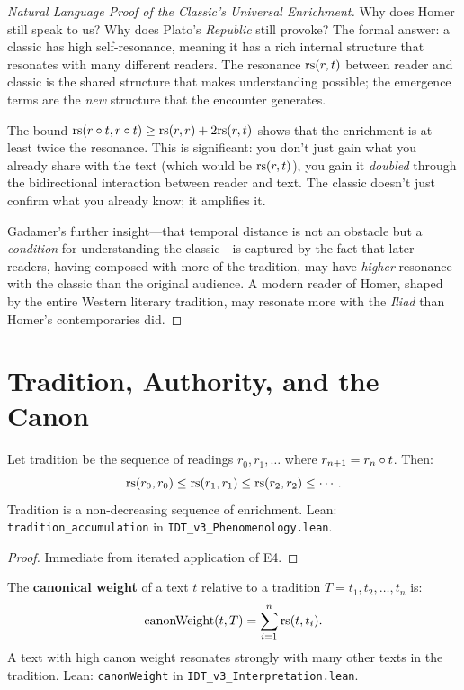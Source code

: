\begin{proof}[Natural Language Proof of the Classic's Universal Enrichment]
Why does Homer still speak to us?  Why does Plato's \textit{Republic} still
provoke?  The formal answer: a classic has high self-resonance, meaning it
has a rich internal structure that resonates with many different readers.
The resonance $\mathrm{rs}(r, t)$ between reader and classic is the shared structure
that makes understanding possible; the emergence terms are the \emph{new}
structure that the encounter generates.

The bound $\mathrm{rs}(r \circ t, r \circ t) \geq \mathrm{rs}(r, r) + 2\mathrm{rs}(r, t)$
shows that the enrichment is at least twice the resonance.  This is
significant: you don't just gain what you already share with the text
(which would be $\mathrm{rs}(r, t)$), you gain it \emph{doubled} through the
bidirectional interaction between reader and text.  The classic doesn't
just confirm what you already know; it amplifies it.

Gadamer's further insight---that temporal distance is not an obstacle but
a \emph{condition} for understanding the classic---is captured by the fact
that later readers, having composed with more of the tradition, may have
\emph{higher} resonance with the classic than the original audience.  A
modern reader of Homer, shaped by the entire Western literary tradition,
may resonate more with the \textit{Iliad} than Homer's contemporaries did.
\end{proof}

\section{Tradition, Authority, and the Canon}

\begin{theorem}
\label{thm:tradition-accumulation}
Let tradition be the sequence of readings $r_0, r_1, \ldots$ where
$r_{n+1} = r_n \circ t$.  Then:
\[
\mathrm{rs}(r_0, r_0) \leq \mathrm{rs}(r_1, r_1) \leq \mathrm{rs}(r_2, r_2) \leq \cdots.
\]
Tradition is a non-decreasing sequence of enrichment.
Lean: \texttt{tradition\_accumulation} in \texttt{IDT\_v3\_Phenomenology.lean}.
\end{theorem}

\begin{proof}
Immediate from iterated application of E4.
\end{proof}

\begin{definition}
\label{def:canon-weight}
The \textbf{canonical weight} of a text $t$ relative to a tradition
$T = t_1, t_2, \ldots, t_n$ is:
\[
\mathrm{canonWeight}(t, T) = \sum_{i=1}^{n} \mathrm{rs}(t, t_i).
\]
A text with high canon weight resonates strongly with many other texts in
the tradition.
Lean: \texttt{canonWeight} in \texttt{IDT\_v3\_Interpretation.lean}.
\end{definition}

